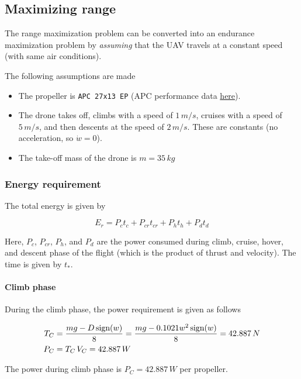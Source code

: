 \subsection{Maximizing range}

The range maximization problem can be converted into an endurance maximization problem by \emph{assuming} that the UAV travels at a constant speed (with same air conditions).

The following assumptions are made

\begin{itemize}
    \item The propeller is \texttt{APC 27x13 EP} (APC performance data \href{https://www.apcprop.com/files/PER3_27x13E.dat}{here}).
    \item The drone takes off, climbs with a speed of $1\,m/s$, cruises with a speed of $5\,m/s$, and then descents at the speed of $2\,m/s$. These are constants (no acceleration, so $\dot{w} = 0$).
    \item The take-off mass of the drone is $m = 35\,kg$
\end{itemize}

\subsubsection*{Energy requirement}

The total energy is given by

\begin{equation*}
    E_r = P_c t_c + P_{cr} t_{cr} + P_h t_h + P_d t_d
\end{equation*}

Here, $P_c$, $P_{cr}$, $P_h$, and $P_d$ are the power consumed during climb, cruise, hover, and descent phase of the flight (which is the product of thrust and velocity). The time is given by $t_*$.

\paragraph*{Climb phase}
During the climb phase, the power requirement is given as follows

\begin{align*}
    T_C &= \frac{mg - D\,\textup{sign}(w)}{8} = \frac{mg - 0.1021 w^2\,\textup{sign}(w)}{8} = 42.887\,N \\
    P_C &= T_C \, V_C = 42.887 \, W
\end{align*}

The power during climb phase is $P_C = 42.887 \, W$ per propeller.

